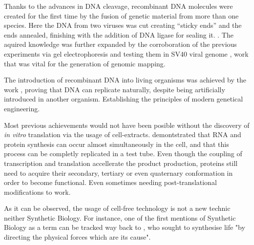 Thanks to the advances in DNA cleavage, recombinant DNA molecules were created
for the first time by the fusion of genetic material from more than one species.
Here the DNA from two viruses was cut creating “sticky ends” and the ends
annealed, finishing with the addition of DNA ligase for sealing it.
\cite{jackson1972biochemical}. The aquired knowledge was further expanded by the
corroboration of the previous experiments via gel electrophoresis and testing
them in SV40 viral genome \cite{danna1971specific}, work that was vital for the
generation of genomic mapping.

The introduction of recombinant DNA into living organisms was achieved by the
work \cite{cohen1973construction}, proving that DNA can replicate naturally,
despite being artificially introduced in another organism. Establishing the
principles of modern genetical engineering.

Most previous achievements would not have been posible without the discovery of
\textit{in vitro} translation via the usage of cell-extracts.
\cite{miller1970visualization} demontstrated that RNA and protein synthesis can
occur almost simultaneously in the cell, and that this process can be completly
replicated in a test tube. Even though the coupling of transcription and
translation accellerate the product production, proteins still need to acquire
their secondary, tertiary or even quaternary conformation in order to become
functional. Even sometimes needing post-translational modifications to work.  

As it can be observed, the usage of cell-free technology is not a new technic
neither Synthetic Biology. For instance, one of the first mentions of Synthetic
Biology as a term can be tracked way back to \cite{leduc1912biologie}, who sought to
synthesise life "by directing the physical forces which are its cause".


